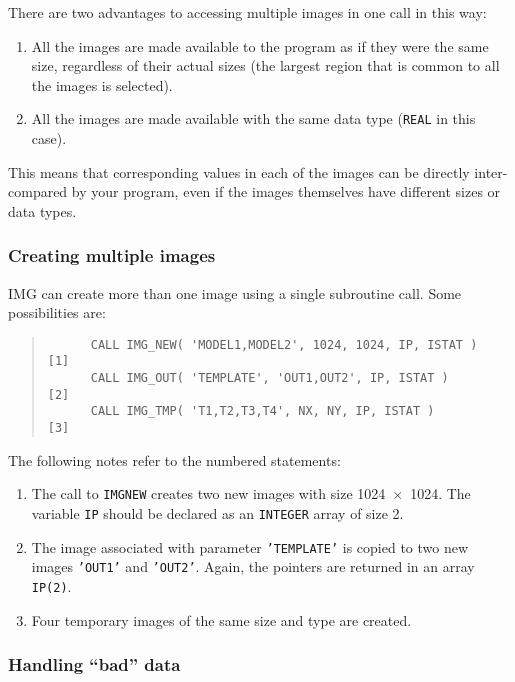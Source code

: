 \documentclass[twoside,11pt]{article}
\newcommand{\htmlref}[2]{#1}
\renewcommand{\_}{\texttt{\symbol{95}}}
\newcommand{\myverb}[1]{{\texttt{#1}}}
\newcommand{\mynote}{The following notes refer to the numbered statements:}
\newenvironment{code}{\begin{small} \begin{quote}}
                     {\end{quote} \end{small}}
\newenvironment{enumnotes}
{
   \renewcommand{\labelenumi}{\myverb{[\theenumi]}}
   \begin{enumerate}
}{
   \end{enumerate}
   \renewcommand{\labelenumi}{\theenumi}
}
\renewenvironment{enumnotes}
  {
    \begin{enumerate}
  }{
    \end{enumerate}
  }
\begin{document}
There are two advantages to accessing multiple images in one call in
this way:
\begin{enumerate}
\item
All the images are made available to the program as if they were the
same size, regardless of their actual sizes (the largest region that
is common to all the images is selected).

\item
All the images are made available with the same data type
(\myverb{REAL} in this case).
\end{enumerate}
This means that corresponding values in each of the images can be
directly inter-compared by your program, even if the images themselves
have different sizes or data types.

\subsubsection{Creating multiple images}
IMG can  create more than one image using a single
subroutine call. Some possibilities are:
\begin{code}
\begin{verbatim}
      CALL IMG_NEW( 'MODEL1,MODEL2', 1024, 1024, IP, ISTAT )  [1]
      CALL IMG_OUT( 'TEMPLATE', 'OUT1,OUT2', IP, ISTAT )      [2]
      CALL IMG_TMP( 'T1,T2,T3,T4', NX, NY, IP, ISTAT )        [3]
\end{verbatim}
\end{code}
\mynote
\begin{enumnotes}
\item The call to \htmlref{\myverb{IMG\_NEW}}{IMG_NEWnx} creates two new images with size
1024~$\times$~1024. The variable \myverb{IP} should be declared as
an \myverb{INTEGER} array of size 2.

\item The image associated with parameter \myverb{'TEMPLATE'} is
copied to two new images \myverb{'OUT1'} and \myverb{'OUT2'}.
Again, the pointers are returned in an array \myverb{IP(2)}.

\item Four temporary images of the same size and type are created.
\end{enumnotes}

\subsubsection{Handling \label{IMGBADDATA}``bad'' data}
\end{document}

